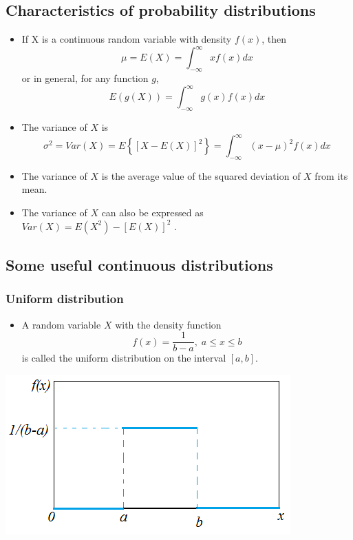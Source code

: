 \documentclass[
]{article}
\providecommand{\tightlist}{%
  \setlength{\itemsep}{0pt}\setlength{\parskip}{0pt}}
\begin{document}
\hypertarget{characteristics-of-probability-distributions}{%
\subsection{Characteristics of probability
distributions}\label{characteristics-of-probability-distributions}}

\begin{itemize}
\item
  If X is a continuous random variable with density \(f (x)\), then
  \[\mu= E(X) =\int_{-\infty}^{\infty}x f (x) dx\] or in general, for
  any function \(g\), \[E(g(X)) =\int_{-\infty}^{\infty}g(x) f (x) dx\]
\item
  The variance of \(X\) is
  \[\sigma^2=Var(X) = E\left\{[X - E(X)]^2\right\}=\int_{-\infty}^{\infty}(x -\mu)^2 f (x) dx\]
\item
  The variance of \(X\) is the average value of the squared deviation of
  \(X\) from its mean.

  \item

  The variance of \(X\) can also be expressed as
  \(Var(X)=E(X^2)-[E(X)]^2\) .
\end{itemize}

\hypertarget{some-useful-continuous-distributions}{%
\subsection{Some useful continuous
distributions}\label{some-useful-continuous-distributions}}

\hypertarget{uniform-distribution}{%
\subsubsection{Uniform distribution}\label{uniform-distribution}}

\begin{itemize}
\tightlist
\item
  A random variable \(X\) with the density function
  \[f (x) =\frac{1}{b - a},\; a \leq  x \leq b\] is called the uniform
  distribution on the interval \([a,b]\).
\end{itemize}

\begin{center}\includegraphics[width=0.5\linewidth,height=0.5\textheight]{uniform} \end{center}
\end{document}
